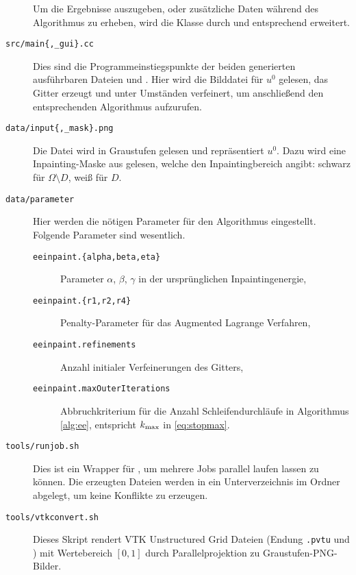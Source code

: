\documentclass{mythesis}
\begin{document}
\begin{description}
	Um die Ergebnisse auszugeben, oder zusätzliche Daten während des Algorithmus zu erheben, wird die Klasse durch  und  entsprechend erweitert.
    \item[\texttt{src/main\{,_gui\}.cc}]
	Dies sind die Programmeinstiegspunkte der beiden generierten ausführbaren Dateien  und .
	Hier wird die Bilddatei für $u^0$ gelesen, das Gitter erzeugt und unter Umständen verfeinert, um anschließend den entsprechenden Algorithmus aufzurufen.
   \item[\texttt{data/input\{,_mask\}.png}]
	Die Datei  wird in Graustufen gelesen und repräsentiert $u^0$.
	Dazu wird eine Inpainting-Maske aus  gelesen, welche den Inpaintingbereich angibt: schwarz für $\Omega \setminus D$, weiß für $D$.
    \item[\texttt{data/parameter}]
	Hier werden die nötigen Parameter für den Algorithmus eingestellt.
	Folgende Parameter sind wesentlich.
	\begin{description}
	    \item[\texttt{eeinpaint.\{alpha,beta,eta\}}]
		Parameter $\alpha$, $\beta$, $\gamma$ in der ursprünglichen Inpaintingenergie,
	    \item[\texttt{eeinpaint.\{r1,r2,r4\}}]
		Penalty-Parameter für das Augmented Lagrange Verfahren,
	    \item[\texttt{eeinpaint.refinements}]
		Anzahl initialer Verfeinerungen des Gitters,
	    \item[\texttt{eeinpaint.maxOuterIterations}]
		Abbruchkriterium für die Anzahl Schleifendurchläufe in Algorithmus \ref{alg:ee}, entspricht $k_{\mathrm{max}}$ in \eqref{eq:stopmax}.
	\end{description}
    \item[\texttt{tools/runjob.sh}]
	Dies ist ein Wrapper für , um mehrere Jobs parallel laufen lassen zu können.
	Die erzeugten Dateien werden in ein Unterverzeichnis im Ordner  abgelegt, um keine Konflikte zu erzeugen.
    \item[\texttt{tools/vtkconvert.sh}]
	Dieses Skript rendert VTK Unstructured Grid Dateien (Endung \texttt{.pvtu} und ) mit Wertebereich $[0,1]$ durch Parallelprojektion zu Graustufen-PNG-Bilder.
\end{description}
\end{document}
